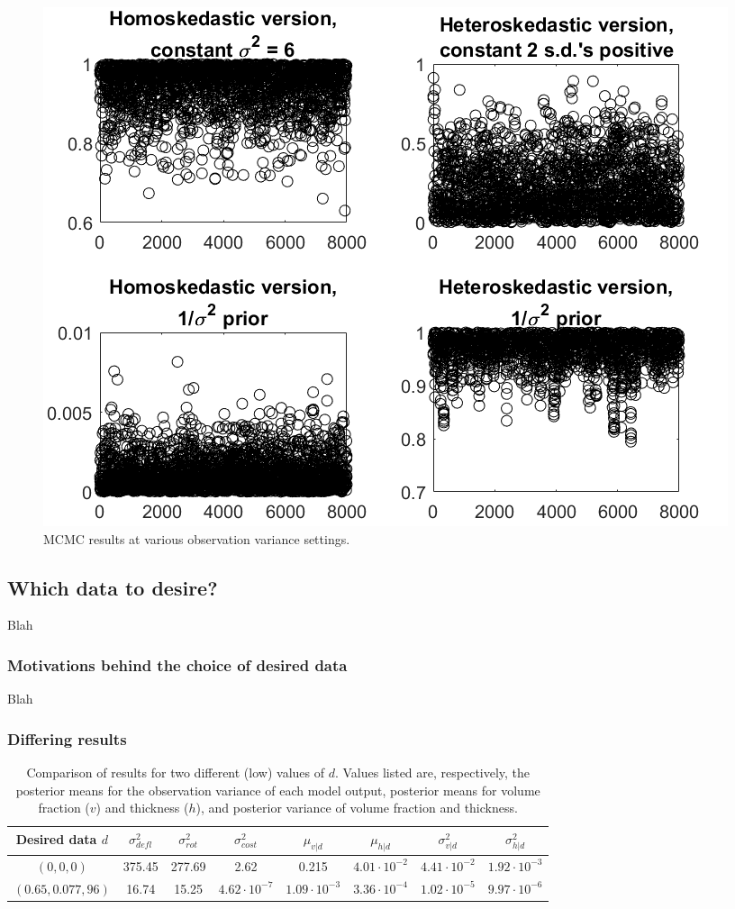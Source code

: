 \documentclass{article}
\begin{document}
\begin{figure}
\centering
\includegraphics[width=.65\linewidth]{comp_obs_var}
\caption{MCMC results at various observation variance settings.}
\label{fig:comp_obs_var}
\end{figure}

\subsection{Which data to desire?}\label{which_data}
Blah

\subsubsection{Motivations behind the choice of desired data}
Blah

\subsubsection{Differing results}
\begin{table}[h]
\centering
\begin{tabular}{| c | c  | c  |  c | c  | c | c | c |}
\hline
Desired data $d$ & $\sigma^2_{defl}$ & $\sigma^2_{rot}$ & $\sigma^2_{cost}$ & $\mu_{v|d}$ &
                            $\mu_{h|d}$ & $\sigma^2_{v|d}$ & $\sigma^2_{h|d}$\\
\hline
$(0, 0, 0)$ & 375.45 & 277.69 & 2.62 & 0.215 & $4.01 \cdot 10^{-2}$&
	$4.41\cdot 10^{-2}$ & $1.92 \cdot 10^{-3}$\\
$(0.65, 0.077, 96)$ & 16.74 & 15.25 & $4.62 \cdot 10^{-7}$ &
	$1.09 \cdot 10^{-3}$ & $3.36 \cdot10^{-4}$ &
	$1.02 \cdot 10^{-5}$ & $9.97 \cdot 10^{-6}$\\
\hline
\end{tabular}
\caption{Comparison of results for two different (low) values of $d$. Values listed are, respectively, the posterior means for the observation variance of each model output, posterior means for volume fraction ($v$) and thickness ($h$), and posterior variance of volume fraction and thickness.}
\label{table:d_comp}
\end{table}
\end{document}

